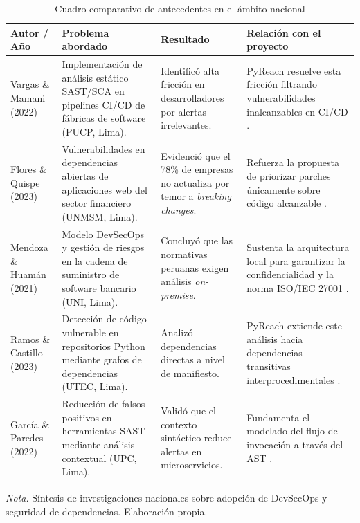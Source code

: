 \begin{table}[H]
\centering
\caption{Cuadro comparativo de antecedentes en el ámbito nacional}
\label{tab:antecedentes_nacionales}
\small
{}
\begin{tabularx}{\textwidth}{>{\raggedright\arraybackslash}p{3.2cm} >{\raggedright\arraybackslash}p{3.8cm} >{\raggedright\arraybackslash}p{3.6cm} X}
\toprule
\textbf{Autor / Año} & \textbf{Problema abordado} & \textbf{Resultado} & \textbf{Relación con el proyecto} \\
\midrule
Vargas \& Mamani (2022) & 
Implementación de análisis estático SAST/SCA en pipelines CI/CD de fábricas de software (PUCP, Lima). & 
Identificó alta fricción en desarrolladores por alertas irrelevantes. & 
PyReach resuelve esta fricción filtrando vulnerabilidades inalcanzables en CI/CD \parencite{vargas2022analisis}. \\ %
\addlinespace
Flores \& Quispe (2023) & 
Vulnerabilidades en dependencias abiertas de aplicaciones web del sector financiero (UNMSM, Lima). & 
Evidenció que el 78\% de empresas no actualiza por temor a \textit{breaking changes}. & 
Refuerza la propuesta de priorizar parches únicamente sobre código alcanzable \parencite{flores2023vulnerabilidades}. \\ %
\addlinespace
Mendoza \& Huamán (2021) & 
Modelo DevSecOps y gestión de riesgos en la cadena de suministro de software bancario (UNI, Lima). & 
Concluyó que las normativas peruanas exigen análisis \textit{on-premise}. & 
Sustenta la arquitectura local para garantizar la confidencialidad y la norma ISO/IEC 27001 \parencite{mendoza2021devsecops}. \\ %
\addlinespace
Ramos \& Castillo (2023) & 
Detección de código vulnerable en repositorios Python mediante grafos de dependencias (UTEC, Lima). & 
Analizó dependencias directas a nivel de manifiesto. & 
PyReach extiende este análisis hacia dependencias transitivas interprocedimentales \parencite{ramos2023deteccion}. \\ %
\addlinespace
García \& Paredes (2022) & 
Reducción de falsos positivos en herramientas SAST mediante análisis contextual (UPC, Lima). & 
Validó que el contexto sintáctico reduce alertas en microservicios. & 
Fundamenta el modelado del flujo de invocación a través del AST \parencite{garcia2022reduccion}. \\ %
\bottomrule
\end{tabularx}
\vspace{2pt}
\begin{flushleft}
\scriptsize \textit{Nota.} Síntesis de investigaciones nacionales sobre adopción de DevSecOps y seguridad de dependencias. Elaboración propia.
\end{flushleft}
\end{table}

